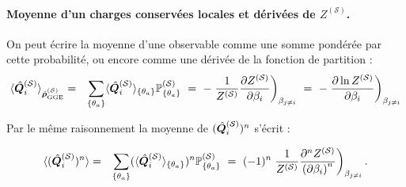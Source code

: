 \paragraph{Moyenne d’un charges conservées locales et dérivées de $Z^{(\mathcal{S})}$.}
On peut écrire la moyenne d’une observable comme une somme pondérée par cette probabilité, ou encore comme une dérivée de la fonction de partition :
\begin{eqnarray}
	\langle \hat{\bm{Q}}_i^{(\mathcal{S})} \rangle_{\hat{\bm{\rho}}^{(\mathcal{S})}_{\mathrm{GGE}}} &= & \sum_{\{ \theta_a\}} \langle \hat{\bm{Q}}_i^{(\mathcal{S})} \rangle_{\{\theta_a \}} \mathbb{P}^{(\mathcal{S})}_{\{ \theta_a \}} ~=~- \left. \frac{1}{Z^{(\mathcal{S})}} \frac{\partial Z^{(\mathcal{S})}}{\partial \beta_i} \right )_{\beta_{j \neq i }} ~=~ - 	\left . \frac{\partial  \ln Z^{(\mathcal{S})}}{\partial \beta_i} \right )_{\beta_{j \neq i }}	
\end{eqnarray}

Par le même raisonnement la moyenne de $(\hat{\bm{Q}}_i^{(\mathcal{S})})^n$ s'écrit :

\begin{eqnarray}
	\langle (\hat{\bm{Q}}_i^{(\mathcal{S})})^n \rangle &= & \sum_{\{ \theta_a\}} (\langle\hat{\bm{Q}}_i^{(\mathcal{S})}\rangle_{\{\theta_a\}})^n \mathbb{P}^{(\mathcal{S})}_{\{ \theta_a \}} ~=~ (-1)^n \left. \frac{1}{Z^{(\mathcal{S})}} \frac{\partial^n Z^{(\mathcal{S})}}{{(\partial \beta_i)}^n} \right )_{\beta_{j \neq i }} .	
\end{eqnarray}

